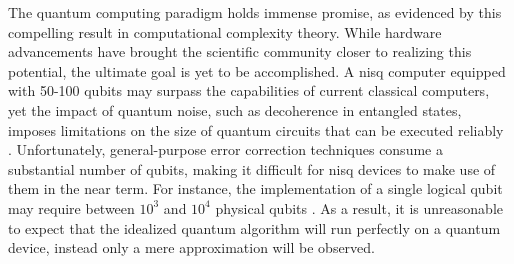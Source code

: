 


The quantum computing paradigm holds immense promise, as evidenced by this compelling result in computational complexity theory.  While hardware advancements have brought the scientific community closer to realizing this potential, the ultimate goal is yet to be accomplished. A \acrfull{nisq} computer equipped with 50-100 qubits may surpass the capabilities of current classical computers, yet the impact of quantum noise, such as decoherence in entangled states, imposes limitations on the size of quantum circuits that can be executed reliably \cite{preskill2018quantum}. Unfortunately, general-purpose error correction techniques \cite{calderbank1996good, gottesman1997stabilizer, steane1996error} consume a substantial number of qubits, making it difficult for \acrshort{nisq} devices to make use of them in the near term. For instance, the implementation of a single logical qubit may require between $10^3$ and $10^4$ physical qubits \cite{fowler2012surface}. As a result, it is unreasonable to expect that the idealized quantum algorithm will run perfectly on a quantum device, instead
only a mere approximation will be observed.

